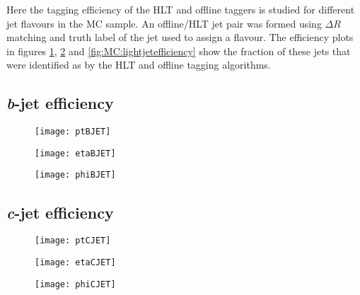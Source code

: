 	Here the tagging efficiency of the HLT and offline taggers is studied for different jet flavours in the MC sample. An offline/HLT jet pair was formed using $\Delta R$ matching and truth label of the jet used to assign a flavour. The efficiency plots in figures \ref{fig:MC:bjetefficiency}, \ref{fig:MC:cjetefficiency} and \ref{fig:MC:lightjetefficiency} show the fraction of these jets that were identified as \bjets by the HLT and offline tagging algorithms.

	\newpage
	\subsection{\textit{b}-jet efficiency}

		\begin{figure}[h]
			\centering
			\begin{minipage}[h]{0.31\linewidth}
				\texttt{[image: ptBJET]}

			\end{minipage}
			\quad
			\begin{minipage}[h]{0.31\linewidth}
				\texttt{[image: etaBJET]}
			\end{minipage}
			\quad
			\begin{minipage}[h]{0.31\linewidth}
				\texttt{[image: phiBJET]}
			\end{minipage}
			\caption{ }
			\label{fig:MC:bjetefficiency}
		\end{figure}


	\subsection{\textit{c}-jet efficiency}

		\begin{figure}[h]
			\centering
			\begin{minipage}[h]{0.31\linewidth}
				\texttt{[image: ptCJET]}

			\end{minipage}
			\quad
			\begin{minipage}[h]{0.31\linewidth}
				\texttt{[image: etaCJET]}
			\end{minipage}
			\quad
			\begin{minipage}[h]{0.31\linewidth}
				\texttt{[image: phiCJET]}
			\end{minipage}
			\caption{ }
			\label{fig:MC:cjetefficiency}
		\end{figure}

